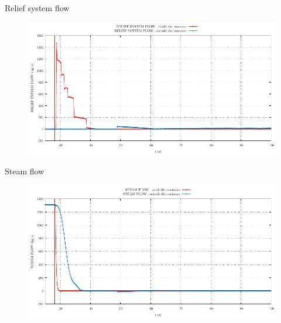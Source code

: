 \begin{frame}{Relief system flow}
	\begin{figure}
		\centering
		\includegraphics[width=\textwidth]{./graphs/RELIEF SYSTEM FLOW_comp.pdf}
		
	\end{figure}
	
\end{frame}


\begin{frame}{Steam flow}
	\begin{figure}
		\centering
		\includegraphics[width=\textwidth]{./graphs/STEAM FLOW_comp.pdf}
		
	\end{figure}
	
\end{frame}


